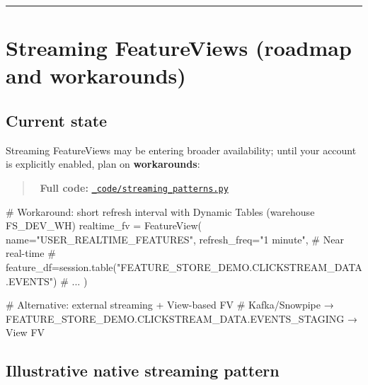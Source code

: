 \documentclass[
  letterpaper,
  DIV=11,
  numbers=noendperiod]{scrreprt}
\newenvironment{Shaded}{\begin{snugshade}}{\end{snugshade}}
\newcommand{\CommentTok}[1]{\textcolor[rgb]{0.37,0.37,0.37}{#1}}
\newcommand{\NormalTok}[1]{\textcolor[rgb]{0.00,0.23,0.31}{#1}}
\newcommand{\OperatorTok}[1]{\textcolor[rgb]{0.37,0.37,0.37}{#1}}
\newcommand{\StringTok}[1]{\textcolor[rgb]{0.13,0.47,0.30}{#1}}
\begin{document}
\begin{center}\rule{0.5\linewidth}{0.5pt}\end{center}

\hypertarget{streaming-featureviews-roadmap-and-workarounds}{%
\section{Streaming FeatureViews (roadmap and
workarounds)}\label{streaming-featureviews-roadmap-and-workarounds}}

\hypertarget{current-state}{%
\subsection{Current state}\label{current-state}}

Streaming FeatureViews may be entering broader availability; until your
account is explicitly enabled, plan on \textbf{workarounds}:

\begin{quote}
📁 \textbf{Full code:}
\href{_code/streaming_patterns.py}{\texttt{\_code/streaming\_patterns.py}}
\end{quote}

\begin{Shaded}
\begin{Highlighting}[]
\CommentTok{\# Workaround: short refresh interval with Dynamic Tables (warehouse FS\_DEV\_WH)}
\NormalTok{realtime\_fv }\OperatorTok{=}\NormalTok{ FeatureView(}
\NormalTok{    name}\OperatorTok{=}\StringTok{"USER\_REALTIME\_FEATURES"}\NormalTok{,}
\NormalTok{    refresh\_freq}\OperatorTok{=}\StringTok{"1 minute"}\NormalTok{,  }\CommentTok{\# Near real{-}time}
    \CommentTok{\# feature\_df=session.table("FEATURE\_STORE\_DEMO.CLICKSTREAM\_DATA.EVENTS")}
    \CommentTok{\# ...}
\NormalTok{)}

\CommentTok{\# Alternative: external streaming + View{-}based FV}
\CommentTok{\# Kafka/Snowpipe → FEATURE\_STORE\_DEMO.CLICKSTREAM\_DATA.EVENTS\_STAGING → View FV}
\end{Highlighting}
\end{Shaded}

\hypertarget{illustrative-native-streaming-pattern}{%
\subsection{Illustrative native streaming
pattern}\label{illustrative-native-streaming-pattern}}
\end{document}
